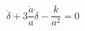 \begin{equation}\label{finaleuqation}
\ddot{\delta}+3\frac{\dot{a}}{a}\dot{\delta}-\frac{k}{a^2}=0
\end{equation}

